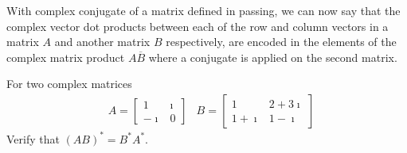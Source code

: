 With complex conjugate of a matrix defined in passing, we can now say that the complex vector dot products between each of the row and column vectors in a matrix $A$ and another matrix $B$ respectively, are encoded in the elements of the complex matrix product $A\overline{B}$ where a conjugate is applied on the second matrix.
\begin{exmp}
For two complex matrices
\begin{align*}
& A =
\begin{bmatrix}
1 & \imath \\
-\imath & 0
\end{bmatrix} 
& B =
\begin{bmatrix}
1 & 2+3\imath \\
1+\imath & 1-\imath
\end{bmatrix}
\end{align*}
Verify that $(AB)^* = B^*A^*$.
\end{exmp}
